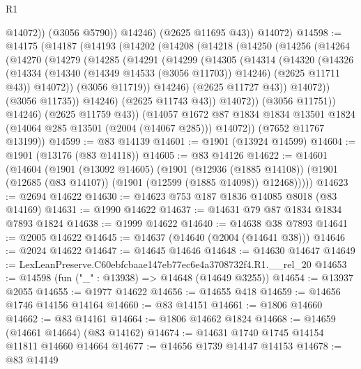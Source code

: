 \begin{lexlean}{R1}
\begin{coremodule}
                @14072))
            (@3056 @5790))
          @14246)
        (@2625 @11695 @43))
      @14072)
@14598 := @14175
    (@14187
      (@14193
        (@14202
          (@14208
            (@14218
              (@14250
                (@14256
                  (@14264
                    (@14270
                      (@14279
                        (@14285
                          (@14291
                            (@14299
                              (@14305
                                (@14314
                                  (@14320
                                    (@14326
                                      (@14334
                                        (@14340 (@14349 @14533 (@3056 @11703)) @14246)
                                        (@2625 @11711 @43))
                                      @14072))
                                  (@3056 @11719))
                                @14246)
                              (@2625 @11727 @43))
                            @14072))
                        (@3056 @11735))
                      @14246)
                    (@2625 @11743 @43))
                  @14072))
              (@3056 @11751))
            @14246)
          (@2625 @11759 @43))
        (@14057
          @1672
          @87
          @1834
          @1834
          @13501
          @1824
          (@14064 @285 @13501 (@2004 (@14067 @285)))
          @14072))
      (@7652 @11767 @13199))
@14599 := @83 @14139
@14601 := @1901 (@13924 @14599)
@14604 := @1901 (@13176 (@83 @14118))
@14605 := @83 @14126
@14622 := @14601
    (@14604
      (@1901
        (@13092 @14605)
        (@1901
          (@12936 (@1885 @14108))
          (@1901 (@12685 (@83 @14107)) (@1901 (@12599 (@1885 @14098)) @12468)))))
@14623 := @2694 @14622
@14630 := @14623 @753 @187 @1836 @14085 @8018 (@83 @14169)
@14631 := @1990 @14622
@14637 := @14631 @79 @87 @1834 @1834 @7893 @1824
@14638 := @1999 @14622
@14640 := @14638 @38 @7893
@14641 := @2005 @14622
@14645 := @14637 (@14640 (@2004 (@14641 @38)))
@14646 := @2024 @14622
@14647 := @14645 @14646
@14648 := @14630 @14647
@14649 := LexLeanPreserve.C60ebfcbaae147eb77ec6e4a3708732f4.R1.__rel_20
@14653 := @14598 (fun ("_" : @13938) => @14648 (@14649 @3255))
@14654 := @13937 @2055
@14655 := @1977 @14622
@14656 := @14655 @418
@14659 := @14656 @1746 @14156 @14164
@14660 := @83 @14151
@14661 := @1806 @14660
@14662 := @83 @14161
@14664 := @1806 @14662 @1824
@14668 := @14659 (@14661 @14664) (@83 @14162)
@14674 := @14631 @1740 @1745 @14154 @11811 @14660 @14664
@14677 := @14656 @1739 @14147 @14153
@14678 := @83 @14149

\end{coremodule}
\end{lexlean}
